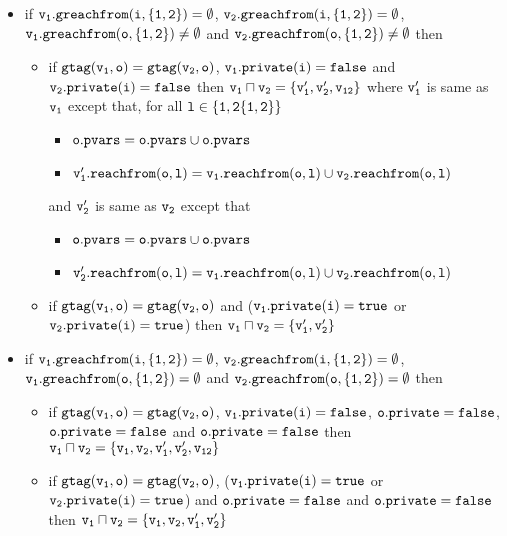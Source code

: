 \begin{itemize}
 \item if $\tt \frag_1.greachfrom(i,\{1,2\}) = \emptyset$, $\tt \frag_2.greachfrom(i,\{1,2\}) = \emptyset$, $\tt \frag_1.greachfrom(o,\{1,2\}) \neq \emptyset$ and $\tt \frag_2.greachfrom(o,\{1,2\}) \neq \emptyset$ then 
  \begin{itemize}
  \item if $\tt gtag(\frag_1, o) = gtag(\frag_2, o)$, $\tt \frag_1.private(i) = false$ and $\tt \frag_2.private(i) = false$ then $\tt \frag_1 \sqcap \frag_2 = \{\frag_1', \frag_2', \frag_{12}\}$ where %
  $\tt \frag_1'$ is same as $\tt \frag_1$ except that, for all $\tt l \in \{1,2 \{1,2\}\}$
    \begin{itemize}
  \item  $\tt \pvarsat{\outat{\frag_1'}} = \pvarsat{\outat{\frag_1}} \cup \pvarsat{\outat{\frag_2}}$
  \item $\tt \frag_1'.reachfrom(o,l) = \frag_{1}.reachfrom(o,l) \cup \frag_{2}.reachfrom(o,l)$
    \end{itemize}
   and $\tt \frag_2'$ is same as $\tt \frag_2$ except that 
    \begin{itemize}
  \item  $\tt \pvarsat{\outat{\frag_2'}} = \pvarsat{\outat{\frag_1}} \cup \pvarsat{\outat{\frag_2}}$
  \item $\tt \frag_2'.reachfrom(o,l) = \frag_{1}.reachfrom(o,l) \cup \frag_{2}.reachfrom(o,l)$
    \end{itemize}
     \item if $\tt gtag(\frag_1, o) = gtag(\frag_2, o)$ and ($\tt \frag_1.private(i) = true$ or $\tt \frag_2.private(i) = true$) then $\tt \frag_1 \sqcap \frag_2 = \{\frag_1', \frag_2'\}$ 
 \end{itemize}
 
 
  \item if $\tt \frag_1.greachfrom(i,\{1,2\}) = \emptyset$, $\tt \frag_2.greachfrom(i,\{1,2\}) = \emptyset$, $\tt \frag_1.greachfrom(o,\{1,2\}) = \emptyset$ and $\tt \frag_2.greachfrom(o,\{1,2\}) = \emptyset$ then 
 \begin{itemize}
 
 
 \item if $\tt gtag(\frag_1, o) = gtag(\frag_2, o)$, $\tt \frag_1.private(i) = false$, $\tt \privateat{\outat{\frag_1}} = false$, $\tt \privateat{\outat{\frag_1}} = false$ and $\tt \privateat{\outat{\frag_2}} = false$ then  $\tt \frag_1 \sqcap \frag_2 = \{\frag_1,\frag_2,\frag_1',\frag_2',\frag_{12}\}$ %
    \item if $\tt gtag(\frag_1, o) = gtag(\frag_2, o)$, ($\tt \frag_1.private(i) = true$ or $\tt \frag_2.private(i) = true$) and $\tt \privateat{\outat{\frag_1}} = false$ and $\tt \privateat{\outat{\frag_2}} = false$ then  $\tt \frag_1 \sqcap \frag_2 = \{\frag_1,\frag_2,\frag_1',\frag_2'\}$  


\end{itemize}
\end{itemize}

